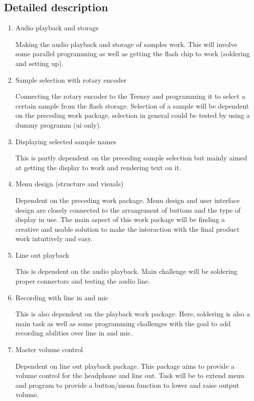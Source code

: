 \subsection{Detailed description}

\begin{enumerate}
	\item Audio playback and storage

		Making the audio playback and storage of samples work.
		This will involve some parallel programming as well as
		getting the flash chip to work (soldering and setting up).

	\item Sample selection with rotary encoder

		Connecting the rotary encoder to the Teensy and programming it
		to select a certain sample from the flash storage. Selection of
		a sample will be dependent on the preceding work package, selection
		in general could be tested by using a dummy programm (ui only).

	\item Displaying selected sample names

		This is partly dependent on the preceding sample selection but mainly
		aimed at getting the display to work and rendering text on it.

	\item Menu design (structure and visuals)

		Dependent on the preceding work package. Menu design and user interface design
		are closely connected to the arrangement of buttons and the type of display 
		in use. The main aspect of this work package will be finding a creative and
		usable solution to make the interaction with the final product work intuitively
		and easy.

	\item Line out playback

		This is dependent on the audio playback. Main challenge will be soldering
		proper connectors and testing the audio line.

	\item Recording with line in and mic

		This is also dependent on the playback work package. Here, soldering is also
		a main task as well as some programming challenges with the goal to add
		recording abilities over line in and mic.

	\item Master volume control

		Dependent on line out playback package. This package aims to provide a
		volume control for the headphone and line out. Task will be to extend menu
		and program to provide a button/menu function to lower and raise output volume.


\end{enumerate}

